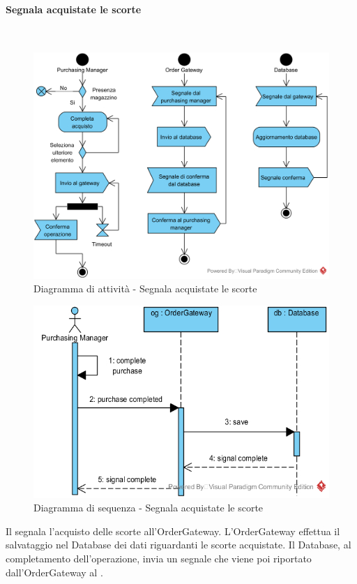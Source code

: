 \paragraph{Segnala acquistate le scorte}\mbox{}\\
\nopagebreak
\begin{figure}[H]
	\centering
	\includegraphics[width=14cm]{diagrammi_img/attivita/responsabile_acquisto.png}
	\caption{Diagramma di attività - Segnala acquistate le scorte}
\end{figure}

\begin{figure}[H]
	\centering
	\includegraphics[width=14cm]{../../documenti/SpecificaTecnica/diagrammi_img/sequenza/responsabile_acquisti_segnala_scorte_acquistate.png}
	\caption{Diagramma di sequenza - Segnala acquistate le scorte}
\end{figure}
Il \Purchasingmanager{} segnala l'acquisto delle scorte all'Order\-Gateway. L'Order\-Gateway effettua il salvataggio nel Database dei dati riguardanti le scorte acquistate. Il Database, al completamento dell'operazione, invia un segnale che viene poi riportato dall'Order\-Gateway al \Purchasingmanager{}.


